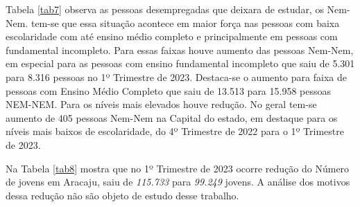 Tabela \ref{tab7} observa as pessoas desempregadas que deixara de
estudar, os Nem-Nem. tem-se que essa situação acontece em maior força
nas pessoas com baixa escolaridade com até ensino médio completo e
principalmente em pessoas com fundamental incompleto. Para essas faixas
houve aumento das pessoas Nem-Nem, em especial para as pessoas com
ensino fundamental incompleto que saiu de 5.301 para 8.316 pessoas no 1º
Trimestre de 2023. Destaca-se o aumento para faixa de pessoas com Ensino
Médio Completo que saiu de 13.513 para 15.958 pessoas NEM-NEM. Para os
níveis mais elevados houve redução. No geral tem-se aumento de 405
pessoas Nem-Nem na Capital do estado, em destaque para os níveis mais
baixos de escolaridade, do 4º Trimestre de 2022 para o 1º Trimestre de
2023.

Na Tabela \ref{tab8} mostra que no 1º Trimestre de 2023 ocorre redução
do Número de jovens em Aracaju, saiu de \emph{115.733} para
\emph{99.249} jovens. A análise dos motivos dessa redução não são objeto
de estudo desse trabalho.

